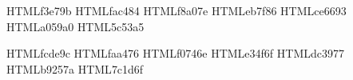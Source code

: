     {}
    {\usepackage[dvipsnames]{xcolor}}

\definecolor{SunsetI}   {HTML}{f3e79b}
\definecolor{SunsetII}  {HTML}{fac484}
\definecolor{SunsetIII} {HTML}{f8a07e}
\definecolor{SunsetIV}  {HTML}{eb7f86}
\definecolor{SunsetV}   {HTML}{ce6693}
\definecolor{SunsetVI}  {HTML}{a059a0}
\definecolor{SunsetVII} {HTML}{5c53a5}

\definecolor{SunsetDarkI}   {HTML}{fcde9c}
\definecolor{SunsetDarkII}  {HTML}{faa476}
\definecolor{SunsetDarkIII} {HTML}{f0746e}
\definecolor{SunsetDarkIV}  {HTML}{e34f6f}
\definecolor{SunsetDarkV}   {HTML}{dc3977}
\definecolor{SunsetDarkVI}  {HTML}{b9257a}
\definecolor{SunsetDarkVII} {HTML}{7c1d6f}
